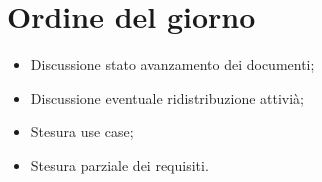 \documentclass[../Riunione16-01-12.tex]{subfiles}
\begin{document}
\section{Ordine del giorno}
\begin{itemize}
	\item Discussione stato avanzamento dei documenti;
	\item Discussione eventuale ridistribuzione attivià;
	\item Stesura use case;
	\item Stesura parziale dei requisiti.
\end{itemize}
\end{document}
